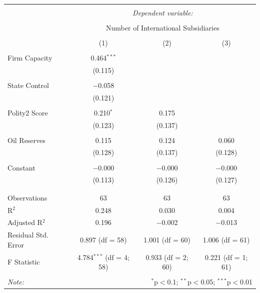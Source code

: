 \documentclass[11pt,]{book}
\begin{document}
\begin{table}[!htbp] \centering 
  \caption{} 
  \label{} 
\begin{tabular}{@{\extracolsep{5pt}}lccc} 
\\[-1.8ex]\hline 
\hline \\[-1.8ex] 
 & \multicolumn{3}{c}{\textit{Dependent variable:}} \\ 
\cline{2-4} 
\\[-1.8ex] & \multicolumn{3}{c}{Number of International Subsidiaries} \\ 
\\[-1.8ex] & (1) & (2) & (3)\\ 
\hline \\[-1.8ex] 
 Firm Capacity & 0.464$^{***}$ &  &  \\ 
  & (0.115) &  &  \\ 
  & & & \\ 
 State Control & $-$0.058 &  &  \\ 
  & (0.121) &  &  \\ 
  & & & \\ 
 Polity2 Score & 0.210$^{*}$ & 0.175 &  \\ 
  & (0.123) & (0.137) &  \\ 
  & & & \\ 
 Oil Reserves & 0.115 & 0.124 & 0.060 \\ 
  & (0.128) & (0.137) & (0.128) \\ 
  & & & \\ 
 Constant & $-$0.000 & $-$0.000 & $-$0.000 \\ 
  & (0.113) & (0.126) & (0.127) \\ 
  & & & \\ 
\hline \\[-1.8ex] 
Observations & 63 & 63 & 63 \\ 
R$^{2}$ & 0.248 & 0.030 & 0.004 \\ 
Adjusted R$^{2}$ & 0.196 & $-$0.002 & $-$0.013 \\ 
Residual Std. Error & 0.897 (df = 58) & 1.001 (df = 60) & 1.006 (df = 61) \\ 
F Statistic & 4.784$^{***}$ (df = 4; 58) & 0.933 (df = 2; 60) & 0.221 (df = 1; 61) \\ 
\hline 
\hline \\[-1.8ex] 
\textit{Note:}  & \multicolumn{3}{r}{$^{*}$p$<$0.1; $^{**}$p$<$0.05; $^{***}$p$<$0.01} \\ 
\end{tabular} 
\end{table}
\end{document}
